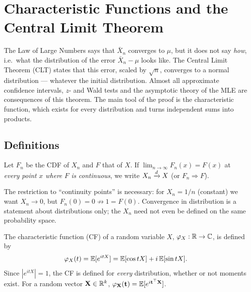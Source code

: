 \documentclass[main.tex]{subfiles}
\begin{document}
\chapter{Characteristic Functions and the Central Limit Theorem}\label{ch:clt}

The Law of Large Numbers says that $\bar X_n$ converges to $\mu$, but it does not say \emph{how}, i.e.\ what the distribution of the error $\bar X_n-\mu$ looks like. The Central Limit Theorem (CLT) states that this error, scaled by $\sqrt n$, converges to a normal distribution --- whatever the initial distribution. Almost all approximate confidence intervals, $z$- and Wald tests and the asymptotic theory of the MLE are consequences of this theorem. The main tool of the proof is the characteristic function, which exists for every distribution and turns independent sums into products.

\section{Definitions}

\begin{definition}\label{def:dagilimda}
Let $F_n$ be the CDF of $X_n$ and $F$ that of $X$. If $\lim_{n\to\infty}F_n(x)=F(x)$ at \emph{every point $x$ where $F$ is continuous}, we write $X_n\xrightarrow{d} X$ (or $F_n\Rightarrow F$).
\end{definition}

\begin{remark}
The restriction to ``continuity points'' is necessary: for $X_n=1/n$ (constant) we want $X_n\to0$, but $F_n(0)=0\not\to1=F(0)$. Convergence in distribution is a statement about distributions only; the $X_n$ need not even be defined on the same probability space.
\end{remark}

\begin{definition}
The characteristic function (CF) of a random variable $X$, $\varphi_X:\mathbb{R}\to\mathbb{C}$, is defined by
\[
\varphi_X(t) = \mathbb{E}[e^{itX}]=\mathbb{E}[\cos tX]+i\,\mathbb{E}[\sin tX] .
\]
Since $|e^{itX}|=1$, the CF is defined for \emph{every} distribution, whether or not moments exist. For a random vector $\mathbf{X}\in\mathbb{R}^k$, $\varphi_{\mathbf{X}}(\mathbf t)=\mathbb{E}[e^{i\mathbf t^\top\mathbf{X}}]$.
\end{definition}
\end{document}
